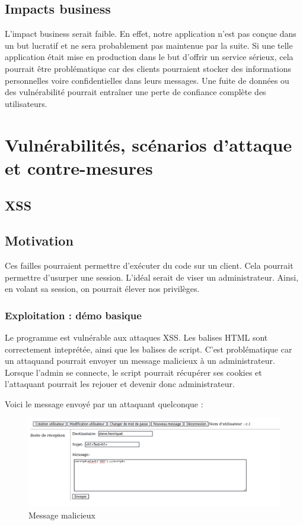 \documentclass[12pt]{article}
\begin{document}
\subsection{Impacts business}
L'impact business serait faible. En effet, notre application n'est pas conçue dans un but lucratif et ne sera probablement pas maintenue par la suite. Si une telle application était mise en production dans le but d'offrir un service sérieux, cela pourrait être problématique car des clients pourraient stocker des informations personnelles voire confidentielles  dans leurs messages. Une fuite de données ou des vulnérabilité pourrait entraîner une perte de confiance complète des utilisateurs.

\section{Vulnérabilités, scénarios d'attaque et contre-mesures}
\subsection{XSS}
\subsection{Motivation}
Ces failles pourraient permettre d'exécuter du code sur un client. Cela pourrait permettre d'usurper une session. L'idéal serait de viser un administrateur. Ainsi, en volant sa session, on pourrait élever nos privilèges.
\subsubsection{Exploitation : démo basique}
Le programme est vulnérable aux attaques XSS. Les balises HTML sont correctement inteprétée, ainsi que les balises de script. C'est problématique car un attaquand pourrait envoyer un message malicieux à un administrateur. Lorsque l'admin se connecte, le script pourrait récupérer ses cookies et l'attaquant pourrait les rejouer et devenir donc administrateur.

Voici le message envoyé par un attaquant quelconque : 
\begin{figure}[H]
\centering
\includegraphics[width=\linewidth]{images/xssAttack.png}
\caption{Message malicieux}
\end{figure}
\end{document}
